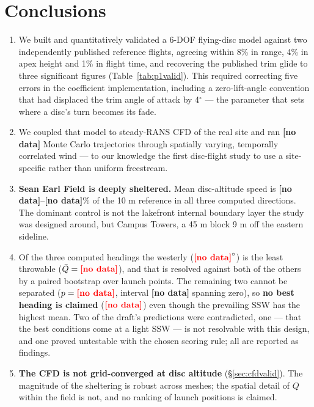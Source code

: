\documentclass[11pt,letterpaper]{article}
\newcommand{\MISSINGNUM}{\textbf{\color{red}[no data]}}%
\newcommand{\UfieldFracMin}{\MISSINGNUM}\newcommand{\UfieldFracMax}{\MISSINGNUM}%
\newcommand{\NtotalThrows}{\MISSINGNUM}\newcommand{\NthrowsPerCell}{\MISSINGNUM}%
\newcommand{\QciNineZerovsTwoOneZero}{\MISSINGNUM}%
\newcommand{\QptNineZerovsTwoOneZero}{\MISSINGNUM}%
\newcommand{\QworstSupported}{\MISSINGNUM}\newcommand{\QbestSupported}{\MISSINGNUM}%
\begin{document}
\section{Conclusions}
\label{sec:conclusions}

\begin{enumerate}[leftmargin=*,itemsep=3pt]
  \item We built and quantitatively validated a 6-DOF flying-disc model against
    two independently published reference flights, agreeing within 8\% in range,
    4\% in apex height and 1\% in flight time, and recovering the published trim
    glide to three significant figures (Table~\ref{tab:p1valid}). This required
    correcting five errors in the coefficient implementation, including a
    zero-lift-angle convention that had displaced the trim angle of attack by
    4$^\circ$ --- the parameter that sets where a disc's turn becomes its fade.

  \item We coupled that model to steady-RANS CFD of the real site and ran
    \NtotalThrows{} Monte Carlo trajectories through spatially varying,
    temporally correlated wind --- to our knowledge the first disc-flight study
    to use a site-specific rather than uniform freestream.

  \item \textbf{Sean Earl Field is deeply sheltered.} Mean disc-altitude speed
    is \UfieldFracMin--\UfieldFracMax\% of the 10 m reference in all three
    computed directions.
    The dominant control is not the lakefront internal boundary layer the study
    was designed around, but Campus Towers, a 45 m block 9 m off the eastern
    sideline.

  \item Of the three computed headings the westerly ($\QworstSupported^\circ$)
    is the least throwable ($\bar Q = \QworstMean$), and that is resolved
    against both of the others by a paired bootstrap over launch points. The
    remaining two cannot be separated ($p = \QptNineZerovsTwoOneZero$, interval
    \QciNineZerovsTwoOneZero{} spanning zero), so \textbf{no best heading is
    claimed} ($\QbestSupported$) even though the prevailing SSW has the highest
    mean. Two of the draft's predictions were contradicted, one --- that the
    best conditions come at a light SSW --- is not resolvable with this design,
    and one proved untestable with the chosen scoring rule; all are reported as
    findings.

  \item \textbf{The CFD is not grid-converged at disc altitude}
    (\S\ref{sec:cfdvalid}). The magnitude of the sheltering is robust across
    meshes; the spatial detail of $Q$ within the field is not, and no ranking of
    launch positions is claimed.
\end{enumerate}
\end{document}
